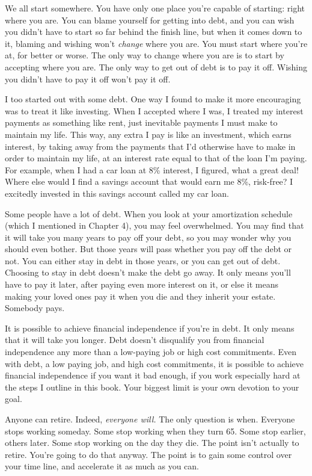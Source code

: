 We all start somewhere. You have only one place you're capable of starting: right where you are. You can blame yourself for getting into debt, and you can wish you didn't have to start so far behind the finish line, but when it comes down to it, blaming and wishing won't \emph{change} where you are. You must start where you're at, for better or worse. The only way to change where you are is to start by accepting where you are. The only way to get out of debt is to pay it off. Wishing you didn't have to pay it off won't pay it off.

I too started out with some debt. One way I found to make it more encouraging was to treat it like investing. When I accepted where I was, I treated my interest payments as something like rent, just inevitable payments I must make to maintain my life. This way, any extra I pay is like an investment, which earns interest, by taking away from the payments that I'd otherwise have to make in order to maintain my life, at an interest rate equal to that of the loan I'm paying. For example, when I had a car loan at 8\% interest, I figured, what a great deal! Where else would I find a savings account that would earn me 8\%, risk-free? I excitedly invested in this savings account called my car loan.

Some people have a lot of debt. When you look at your amortization schedule (which I mentioned in Chapter 4), you may feel overwhelmed. You may find that it will take you many years to pay off your debt, so you may wonder why you should even bother. But those years will pass whether you pay off the debt or not. You can either stay in debt in those years, or you can get out of debt. Choosing to stay in debt doesn't make the debt go away. It only means you'll have to pay it later, after paying even more interest on it, or else it means making your loved ones pay it when you die and they inherit your estate. Somebody pays.

It is possible to achieve financial independence if you're in debt. It only means that it will take you longer. Debt doesn't disqualify you from financial independence any more than a low-paying job or high cost commitments. Even with debt, a low paying job, and high cost commitments, it is possible to achieve financial independence if you want it bad enough, if you work especially hard at the steps I outline in this book. Your biggest limit is your own devotion to your goal.

Anyone can retire. Indeed, \emph{everyone will.} The only question is when. Everyone stops working someday. Some stop working when they turn 65. Some stop earlier, others later. Some stop working on the day they die. The point isn't actually to retire. You're going to do that anyway. The point is to gain some control over your time line, and accelerate it as much as you can.

